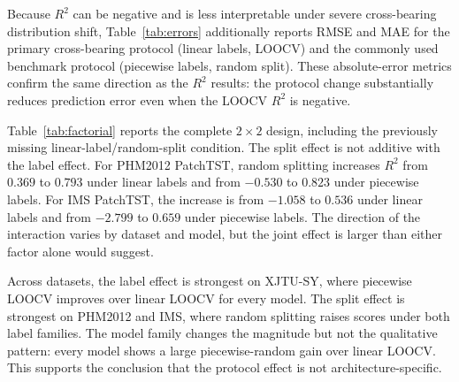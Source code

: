 \documentclass[pdflatex,sn-mathphys-num]{sn-jnl}
\begin{document}
Because $R^2$ can be negative and is less interpretable under severe cross-bearing distribution shift, Table~\ref{tab:errors} additionally reports RMSE and MAE for the primary cross-bearing protocol (linear labels, LOOCV) and the commonly used benchmark protocol (piecewise labels, random split). These absolute-error metrics confirm the same direction as the $R^2$ results: the protocol change substantially reduces prediction error even when the LOOCV $R^2$ is negative.

Table~\ref{tab:factorial} reports the complete $2 \times 2$ design, including the previously missing linear-label/random-split condition. The split effect is not additive with the label effect. For PHM2012 PatchTST, random splitting increases $R^2$ from $0.369$ to $0.793$ under linear labels and from $-0.530$ to $0.823$ under piecewise labels. For IMS PatchTST, the increase is from $-1.058$ to $0.536$ under linear labels and from $-2.799$ to $0.659$ under piecewise labels. The direction of the interaction varies by dataset and model, but the joint effect is larger than either factor alone would suggest.

Across datasets, the label effect is strongest on XJTU-SY, where piecewise LOOCV improves over linear LOOCV for every model. The split effect is strongest on PHM2012 and IMS, where random splitting raises scores under both label families. The model family changes the magnitude but not the qualitative pattern: every model shows a large piecewise-random gain over linear LOOCV. This supports the conclusion that the protocol effect is not architecture-specific.
\end{document}
